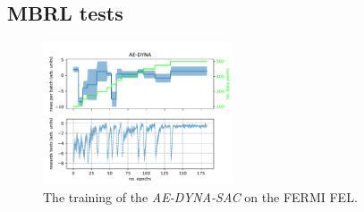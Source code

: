 \documentclass[
reprint,
amsmath,amssymb,amsfonts,clevref,
aps,
prstab,
]{revtex4-2}
\begin{document}
	\subsection{MBRL tests}
	\begin{figure}
		\centering
		\includegraphics*[width=0.5\textwidth]{Figures/AE-DYNA_observables.pdf}
		\caption{The training of the \emph{AE-DYNA-SAC} on the FERMI FEL.}
		\label{fig:AE-DYNA_observables}
	\end{figure}
	
\end{document}
